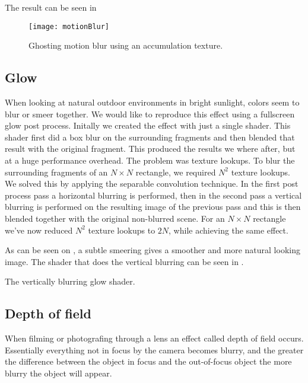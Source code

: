 The result can be seen in 

\begin{figure}
  \label{fig:motionblur}
  \centering
  \texttt{[image: motionBlur]}
  \caption{Ghosting motion blur using an accumulation texture.}
\end{figure}


\subsection{Glow}

When looking at natural outdoor environments in bright sunlight,
colors seem to blur or smeer together. We would like to reproduce this
effect using a fullscreen glow post process. Initally we created the
effect with just a single shader. This shader first did a box blur on
the surrounding fragments and then blended that result with the
original fragment. This produced the results we where after, but at a
huge performance overhead. The problem was texture lookups. To blur
the surrounding fragments of an $N \times N$ rectangle, we required
$N^2$ texture lookups. We solved this by applying the separable
convolution technique. In the first post process pass a horizontal
blurring is performed, then in the second pass a vertical blurring is
performed on the resulting image of the previous pass and this is then
blended together with the original non-blurred scene. For an $N \times
N$ rectangle we've now reduced $N^2$ texture lookups to $2N$, while
achieving the same effect.


As can be seen on , a subtle smeering gives a
smoother and more natural looking image. The shader that does the
vertical blurring can be seen in .

\begin{listing}
\label{lst:glowShader}
\centering
  
\caption{The vertically blurring glow shader.}
\end{listing}


\subsection{Depth of field}

When filming or photografing through a lens an effect called depth of
field occurs. Essentially everything not in focus by the camera
becomes blurry, and the greater the difference between the object in
focus and the out-of-focus object the more blurry the object will
appear.

